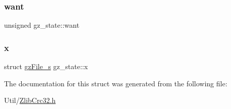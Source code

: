 \mbox{\label{structgz__state_abee992fb115f9f118377b9f46d14b2a5}} 
\subsubsection{\texorpdfstring{want}{want}}
{\footnotesize\ttfamily unsigned gz\+\_\+state\+::want}

\mbox{\label{structgz__state_a92b9a7b77e0b6a494275d8bf0f0f3274}} 
\subsubsection{\texorpdfstring{x}{x}}
{\footnotesize\ttfamily struct \mbox{\hyperlink{structgzFile__s}{gz\+File\+\_\+s}} gz\+\_\+state\+::x}



The documentation for this struct was generated from the following file\+:\begin{DoxyCompactItemize}
\item 
Util/\mbox{\hyperlink{ZlibCrc32_8h}{Zlib\+Crc32.\+h}}\end{DoxyCompactItemize}
